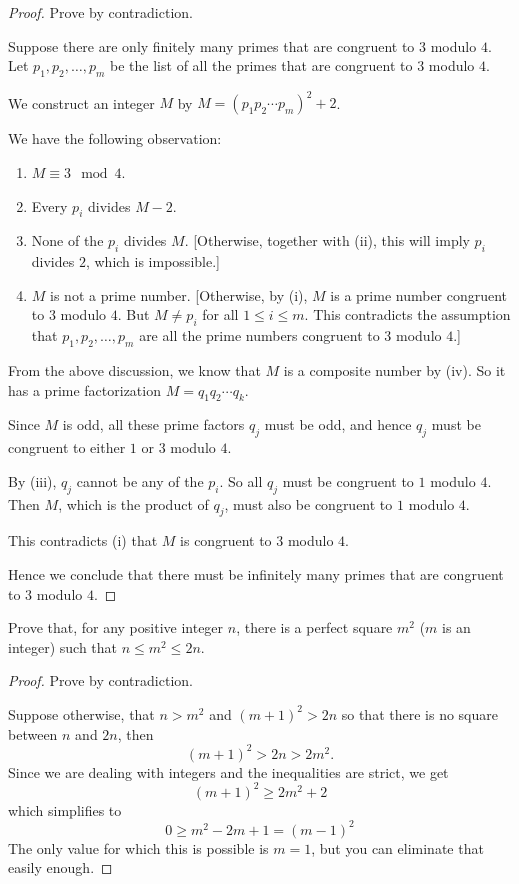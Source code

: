 \begin{proof}
Prove by contradiction.

Suppose there are only finitely many primes that are congruent to $3$ modulo $4$. Let $p_1,p_2,\dots,p_m$ be the list of all the primes that are congruent to $3$ modulo $4$.

We construct an integer $M$ by $M=(p_1p_2\cdots p_m)^2+2$.

We have the following observation:
\begin{enumerate}[label=(\roman*)]
\item  $M\equiv 3 \mod 4$.
\item Every $p_i$ divides $M-2$.
\item None of the $p_i$ divides $M$. [Otherwise, together with (ii), this will imply $p_i$ divides $2$, which is impossible.]
\item $M$ is not a prime number. [Otherwise, by (i), $M$ is a prime number congruent to $3$ modulo $4$. But $M\neq p_i$ for all $1\le i\le m$. This contradicts the assumption that $p_1,p_2,\dots,p_m$ are all the prime numbers congruent to $3$ modulo $4$.]
\end{enumerate}

From the above discussion, we know that $M$ is a composite number by (iv). So it has a prime factorization $M=q_1q_2\cdots q_k$.

Since $M$ is odd, all these prime factors $q_j$ must be odd, and hence $q_j$ must be congruent to either $1$ or $3$ modulo $4$.

By (iii), $q_j$ cannot be any of the $p_i$. So all $q_j$ must be congruent to $1$ modulo $4$. Then $M$, which is the product of $q_j$, must also be congruent to $1$ modulo $4$.

This contradicts (i) that $M$ is congruent to $3$ modulo $4$.

Hence we conclude that there must be infinitely many primes that are congruent to $3$ modulo $4$.
\end{proof}

\begin{prbm}
Prove that, for any positive integer $n$, there is a perfect square $m^2$ ($m$ is an integer) such that $n\le m^2\le 2n$.
\end{prbm}

\begin{proof}
Prove by contradiction.

Suppose otherwise, that $n>m^2$ and $(m+1)^2>2n$ so that there is no square between $n$ and $2n$, then
\[ (m+1)^2>2n>2m^2. \]
Since we are dealing with integers and the inequalities are strict, we get
\[ (m+1)^2\ge2m^2+2 \]
which simplifies to
\[ 0\ge m^2-2m+1=(m-1)^2 \]
The only value for which this is possible is $m=1$, but you can eliminate that easily enough.
\end{proof}

